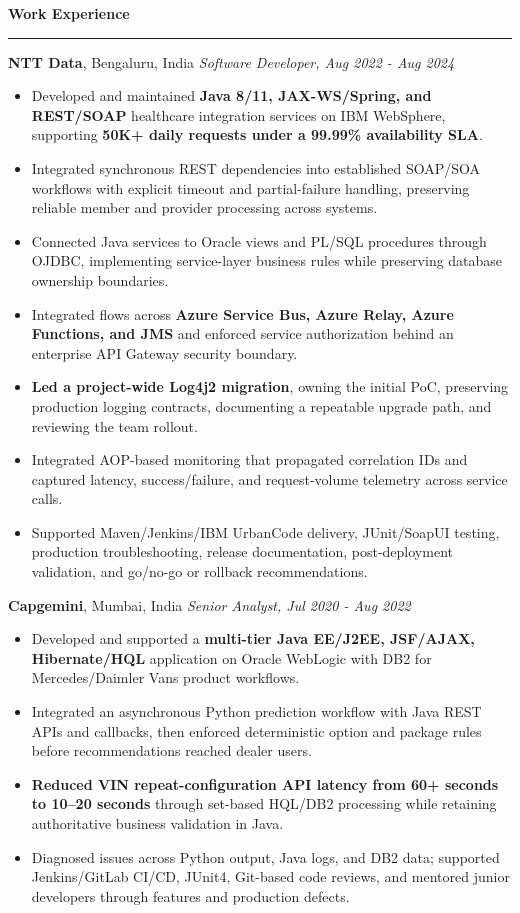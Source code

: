 \documentclass[11pt,letterpaper]{article}
\newcommand{\ressection}[1]{\Needspace{6\baselineskip}\vspace{8pt}\par\textbf{#1}\par\vspace{2pt}\hrule\vspace{5pt}}
\begin{document}
\ressection{Work Experience}
\textbf{NTT Data}, Bengaluru, India \hfill \textit{Software Developer, Aug 2022 - Aug 2024}
\begin{itemize}
  \item Developed and maintained \textbf{Java 8/11, JAX-WS/Spring, and REST/SOAP} healthcare integration services on IBM WebSphere, supporting \textbf{50K+ daily requests under a 99.99\% availability SLA}.
  \item Integrated synchronous REST dependencies into established SOAP/SOA workflows with explicit timeout and partial-failure handling, preserving reliable member and provider processing across systems.
  \item Connected Java services to Oracle views and PL/SQL procedures through OJDBC, implementing service-layer business rules while preserving database ownership boundaries.
  \item Integrated flows across \textbf{Azure Service Bus, Azure Relay, Azure Functions, and JMS} and enforced service authorization behind an enterprise API Gateway security boundary.
  \item \textbf{Led a project-wide Log4j2 migration}, owning the initial PoC, preserving production logging contracts, documenting a repeatable upgrade path, and reviewing the team rollout.
  \item Integrated AOP-based monitoring that propagated correlation IDs and captured latency, success/failure, and request-volume telemetry across service calls.
  \item Supported Maven/Jenkins/IBM UrbanCode delivery, JUnit/SoapUI testing, production troubleshooting, release documentation, post-deployment validation, and go/no-go or rollback recommendations.
\end{itemize}
\textbf{Capgemini}, Mumbai, India \hfill \textit{Senior Analyst, Jul 2020 - Aug 2022}
\begin{itemize}
  \item Developed and supported a \textbf{multi-tier Java EE/J2EE, JSF/AJAX, Hibernate/HQL} application on Oracle WebLogic with DB2 for Mercedes/Daimler Vans product workflows.
  \item Integrated an asynchronous Python prediction workflow with Java REST APIs and callbacks, then enforced deterministic option and package rules before recommendations reached dealer users.
  \item \textbf{Reduced VIN repeat-configuration API latency from 60+ seconds to 10--20 seconds} through set-based HQL/DB2 processing while retaining authoritative business validation in Java.
  \item Diagnosed issues across Python output, Java logs, and DB2 data; supported Jenkins/GitLab CI/CD, JUnit4, Git-based code reviews, and mentored junior developers through features and production defects.
\end{itemize}
\end{document}
